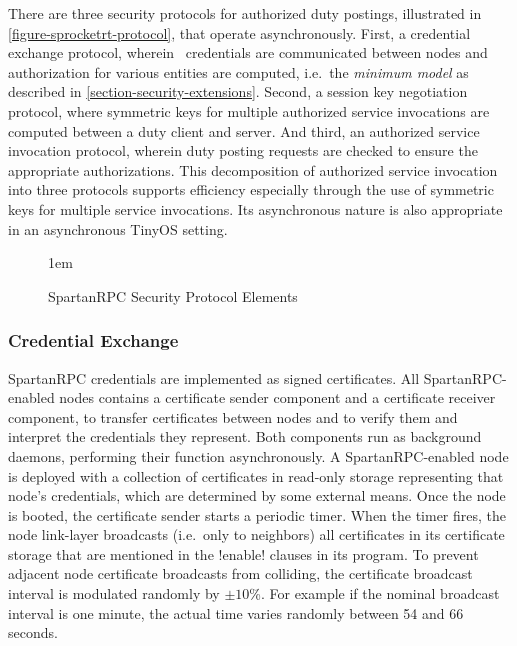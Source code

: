 There are three security protocols for authorized duty postings, illustrated in
\autoref{figure-sprocketrt-protocol}, that operate asynchronously. First, a credential exchange
protocol, wherein \RT\ credentials are communicated between nodes and authorization for various
entities are computed, i.e.~the \emph{minimum model} as described in
\autoref{section-security-extensions}. Second, a session key negotiation protocol, where
symmetric keys for multiple authorized service invocations are computed between a duty client
and server. And third, an authorized service invocation protocol, wherein duty posting requests
are checked to ensure the appropriate authorizations. This decomposition of authorized service
invocation into three protocols supports efficiency especially through the use of symmetric keys
for multiple service invocations. Its asynchronous nature is also appropriate in an asynchronous
TinyOS setting.

\begin{figure}[t]
  
  \centerline{\raise 1em\box\graph}
  \vspace{2mm}
  \caption{SpartanRPC Security Protocol Elements}
  \label{figure-sprocketrt-protocol}
\end{figure}

\subsubsection{Credential Exchange}
\label{section-certificate-format}

SpartanRPC credentials are implemented as signed certificates. All SpartanRPC-enabled nodes
contains a certificate sender component and a certificate receiver component, to transfer
certificates between nodes and to verify them and interpret the credentials they represent. Both
components run as background daemons, performing their function asynchronously. A
SpartanRPC-enabled node is deployed with a collection of certificates in read-only storage
representing that node's credentials, which are determined by some external means. Once the node
is booted, the certificate sender starts a periodic timer. When the timer fires, the node
link-layer broadcasts (i.e.~only to neighbors) all certificates in its certificate storage that
are mentioned in the !enable! clauses in its program. To prevent adjacent node certificate
broadcasts from colliding, the certificate broadcast interval is modulated randomly by $\pm
10$\%. For example if the nominal broadcast interval is one minute, the actual time varies
randomly between 54 and 66 seconds.

